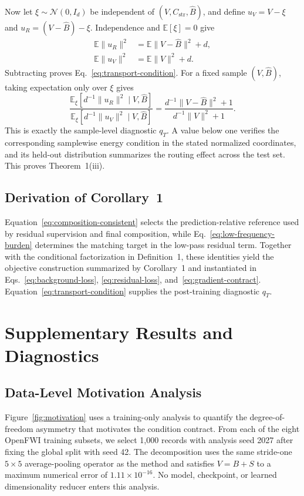 Now let $\xi\sim\mathcal N(0,I_d)$ be independent of $(V,C_{\mathrm{str}},\hat B)$, and define $u_V=V-\xi$ and $u_R=(V-\hat B)-\xi$. Independence and $\mathbb E[\xi]=0$ give
\begin{align}
\mathbb E\|u_R\|^2
&=
\mathbb E\|V-\hat B\|^2+d,\\
\mathbb E\|u_V\|^2
&=
\mathbb E\|V\|^2+d.
\end{align}
Subtracting proves Eq.~\ref{eq:transport-condition}. For a fixed sample $(V,\hat B)$, taking expectation only over $\xi$ gives
\begin{equation}
\frac{\mathbb E_{\xi}[d^{-1}\|u_R\|^2\mid V,\hat B]}
{\mathbb E_{\xi}[d^{-1}\|u_V\|^2\mid V,\hat B]}
=
\frac{d^{-1}\|V-\hat B\|^2+1}{d^{-1}\|V\|^2+1}.
\end{equation}
This is exactly the sample-level diagnostic $q_T$. A value below one verifies the corresponding samplewise energy condition in the stated normalized coordinates, and its held-out distribution summarizes the routing effect across the test set. This proves Theorem~1(iii).

\subsection{Derivation of Corollary~1}
Equation~\ref{eq:composition-consistent} selects the prediction-relative reference used by residual supervision and final composition, while Eq.~\ref{eq:low-frequency-burden} determines the matching target in the low-pass residual term. Together with the conditional factorization in Definition~1, these identities yield the objective construction summarized by Corollary~1 and instantiated in Eqs.~\ref{eq:background-loss}, \ref{eq:residual-loss}, and~\ref{eq:gradient-contract}. Equation~\ref{eq:transport-condition} supplies the post-training diagnostic $q_T$.


\section{Supplementary Results and Diagnostics}
\label{app:supplementary-results}

\subsection{Data-Level Motivation Analysis}
Figure~\ref{fig:motivation} uses a training-only analysis to quantify the degree-of-freedom asymmetry that motivates the condition contract. From each of the eight OpenFWI training subsets, we select 1,000 records with analysis seed 2027 after fixing the global split with seed 42. The decomposition uses the same stride-one $5\times5$ average-pooling operator as the method and satisfies $V=B+S$ to a maximum numerical error of $1.11\times10^{-16}$. No model, checkpoint, or learned dimensionality reducer enters this analysis.

